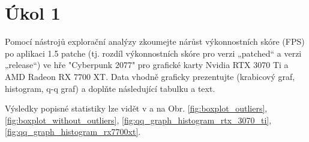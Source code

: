 \section*{Úkol 1}
\label{sec:task-1}

Pomocí nástrojů explorační analýzy zkoumejte nárůst výkonnostních skóre (FPS) po aplikaci 1.5 patche 
(tj. rozdíl výkonnostních skóre pro verzi „patched“ a verzi „release“) ve hře "Cyberpunk 2077" pro grafické karty 
Nvidia RTX 3070 Ti a AMD Radeon RX 7700 XT. Data vhodně graficky prezentujte (krabicový graf, histogram, q-q graf) 
a doplňte následující tabulku a text.

\vspace{2em}
\noindent
Výsledky popisné statistiky lze vidět v  a na Obr. \ref{fig:boxplot_outliers}, \ref{fig:boxplot_without_outliers}, \ref{fig:qq_graph_histogram_rtx_3070_ti}, \ref{fig:qq_graph_histogram_rx7700xt}.

\newcommand{\rangeValues}       {65, 65, 64, 61}
\newcommand{\minValues}         {4.2, 3.2, 4.2, 4}
\newcommand{\QfValues}          {5.30, 4.90, 5.275, 4.900}
\newcommand{\medianValues}      {5.70, 5.30, 5.700, 5.200}
\newcommand{\meanValues}        {5.85, 5.46, 5.713, 5.277}
\newcommand{\QtValues}          {6.20, 5.60, 6.200, 5.600}
\newcommand{\maxValues}         {14.7, 16.0, 7.5, 6.6}
\newcommand{\sdValues}          {1.34, 1.50, 0.736, 0.579}
\newcommand{\cvValues}          {22.8, 27.3, 12.9, 11.0} %
\newcommand{\skewnessValues}    {4.5, 5.5, 0.0, 0.3}
\newcommand{\kurtosisValues}    {28.1, 36.7, -0.4, 0.0}
\newcommand{\lowerBoundValues}  {3.95, 3.85, 0, 0}
\newcommand{\upperBoundValues}  {7.55, 6.65, 0, 0}





